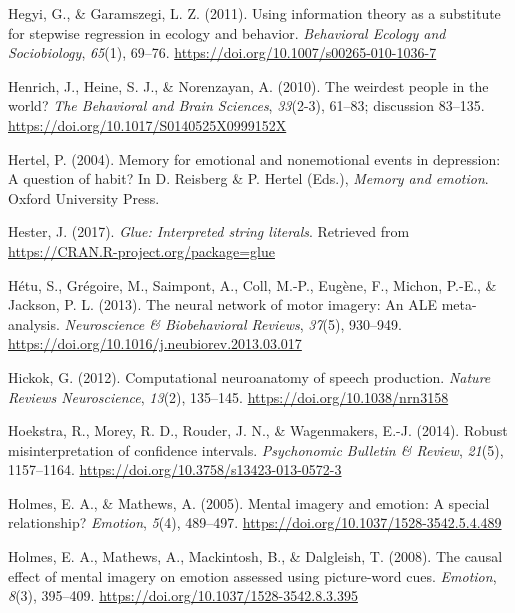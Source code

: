 \documentclass[a4paper,12pt,twoside,onecolumn,openright,final,oldfontcommands]{memoir}
\begin{document}
\leavevmode\hypertarget{ref-hegyi_using_2011}{}%
Hegyi, G., \& Garamszegi, L. Z. (2011). Using information theory as a substitute for stepwise regression in ecology and behavior. \emph{Behavioral Ecology and Sociobiology}, \emph{65}(1), 69--76. \url{https://doi.org/10.1007/s00265-010-1036-7}

\leavevmode\hypertarget{ref-henrich_weirdest_2010}{}%
Henrich, J., Heine, S. J., \& Norenzayan, A. (2010). The weirdest people in the world? \emph{The Behavioral and Brain Sciences}, \emph{33}(2-3), 61--83; discussion 83--135. \url{https://doi.org/10.1017/S0140525X0999152X}

\leavevmode\hypertarget{ref-hertel_memory_2004}{}%
Hertel, P. (2004). Memory for emotional and nonemotional events in depression: A question of habit? In D. Reisberg \& P. Hertel (Eds.), \emph{Memory and emotion}. Oxford University Press.

\leavevmode\hypertarget{ref-R-glue}{}%
Hester, J. (2017). \emph{Glue: Interpreted string literals}. Retrieved from \url{https://CRAN.R-project.org/package=glue}

\leavevmode\hypertarget{ref-hetu_neural_2013}{}%
Hétu, S., Grégoire, M., Saimpont, A., Coll, M.-P., Eugène, F., Michon, P.-E., \& Jackson, P. L. (2013). The neural network of motor imagery: An ALE meta-analysis. \emph{Neuroscience \& Biobehavioral Reviews}, \emph{37}(5), 930--949. \url{https://doi.org/10.1016/j.neubiorev.2013.03.017}

\leavevmode\hypertarget{ref-hickok_computational_2012}{}%
Hickok, G. (2012). Computational neuroanatomy of speech production. \emph{Nature Reviews Neuroscience}, \emph{13}(2), 135--145. \url{https://doi.org/10.1038/nrn3158}

\leavevmode\hypertarget{ref-Hoekstra2014}{}%
Hoekstra, R., Morey, R. D., Rouder, J. N., \& Wagenmakers, E.-J. (2014). Robust misinterpretation of confidence intervals. \emph{Psychonomic Bulletin \& Review}, \emph{21}(5), 1157--1164. \url{https://doi.org/10.3758/s13423-013-0572-3}

\leavevmode\hypertarget{ref-holmes_mental_2005}{}%
Holmes, E. A., \& Mathews, A. (2005). Mental imagery and emotion: A special relationship? \emph{Emotion}, \emph{5}(4), 489--497. \url{https://doi.org/10.1037/1528-3542.5.4.489}

\leavevmode\hypertarget{ref-holmes_causal_2008}{}%
Holmes, E. A., Mathews, A., Mackintosh, B., \& Dalgleish, T. (2008). The causal effect of mental imagery on emotion assessed using picture-word cues. \emph{Emotion}, \emph{8}(3), 395--409. \url{https://doi.org/10.1037/1528-3542.8.3.395}
\end{document}
